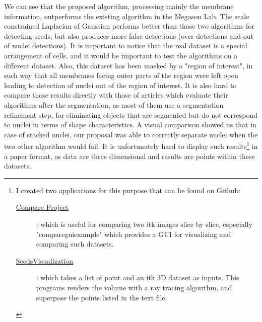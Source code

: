 We can see that the proposed algorithm, processing mainly the membrane information, outperforms the existing algorithm in the Megason Lab.
The scale constrained Laplacian of Gaussian performs better than those two algorithms for detecting seeds, but also produces more false detections
(over detections and out of nuclei detections).
It is important to notice that the real dataset is a special arrangement of cells, and it would be important to test the algorithms on a different dataset. Also, this dataset has been masked by a "region of interest", in such way that all membranes facing outer parts of the region were left open leading to detection of nuclei out of the region of interest.
It is also hard to compare those results directly with those of articles which evaluate their algorithms after the segmentation, as most of them use a segmentation refinement step,
for eliminating objects that are segmented but do not correspond to nuclei in terms of shape characteristics.
A visual comparison showed us that in case of stacked nuclei, our proposal was able to correctly separate nuclei when the two other algorithm would fail. It is unfortunately hard to display such results\footnote{
I created two applications for this purpose that can be found on Github:
\begin{description}
\item[\href{http://github.com/antonin07130/itkCompareProject}{Compare Project}]: which is useful for comparing two itk images slice by slice, especially "compareguiexample" which provides a GUI for visualizing and comparing such datasets.
\item[\href{http://github.com/antonin07130/SeedVisu}{SeedsVisualization}]: which takes a list of point and an itk 3D dataset as inputs. This programs renders the volume with a ray tracing algorithm, and superpose the points listed in the text file.
\end{description}
} in a paper format, as data are three dimensional and results are points within these datasets.

